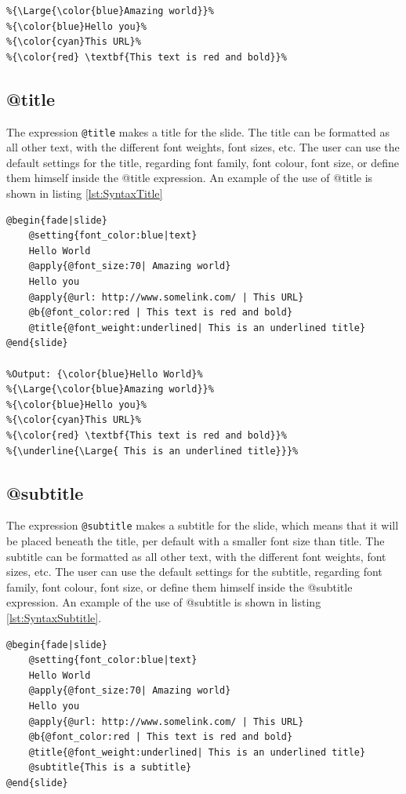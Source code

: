 {\begin{lstlisting}[frame=single, caption=Hello World with font weight, label=lst:SyntaxBUI]
%Output: {\color{blue}Hello World}%
%{\Large{\color{blue}Amazing world}}%
%{\color{blue}Hello you}%
%{\color{cyan}This URL}%
%{\color{red} \textbf{This text is red and bold}}%
\end{lstlisting}

\subsection{@title}
The expression \texttt{@title} makes a title for the slide. The title can be formatted as all other text, with the different font weights, font sizes, etc. The user can use the default settings for the title, regarding font family, font colour, font size, or define them himself inside the @title expression.
An example of the use of @title is shown in listing \ref{lst:SyntaxTitle}

\begin{lstlisting}[frame=single, caption=Hello World with title, label=lst:SyntaxTitle]
@begin{fade|slide}
    @setting{font_color:blue|text}
    Hello World
    @apply{@font_size:70| Amazing world}
    Hello you
    @apply{@url: http://www.somelink.com/ | This URL}
    @b{@font_color:red | This text is red and bold}
    @title{@font_weight:underlined| This is an underlined title}
@end{slide}

%Output: {\color{blue}Hello World}%
%{\Large{\color{blue}Amazing world}}%
%{\color{blue}Hello you}%
%{\color{cyan}This URL}%
%{\color{red} \textbf{This text is red and bold}}%
%{\underline{\Large{ This is an underlined title}}}%
\end{lstlisting}


\subsection{@subtitle}
The expression \texttt{@subtitle} makes a subtitle for the slide, which means that it will be placed beneath the title, per default with a smaller font size than title. The subtitle can be formatted as all other text, with the different font weights, font sizes, etc. The user can use the default settings for the subtitle, regarding font family, font colour, font size, or define them himself inside the @subtitle expression.
An example of the use of @subtitle is shown in listing \ref{lst:SyntaxSubtitle}.
\begin{lstlisting}[frame=single, caption=Hello World with subtitle, label=lst:SyntaxSubtitle]
@begin{fade|slide}
    @setting{font_color:blue|text}
    Hello World
    @apply{@font_size:70| Amazing world}
    Hello you
    @apply{@url: http://www.somelink.com/ | This URL}
    @b{@font_color:red | This text is red and bold}
    @title{@font_weight:underlined| This is an underlined title}
    @subtitle{This is a subtitle}
@end{slide}


\end{lstlisting}}
